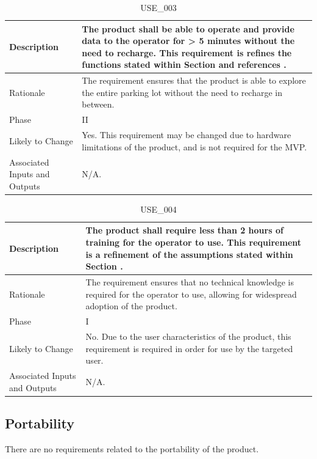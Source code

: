 \documentclass{article}
\begin{document}
\begin{table}[!h]
\begin{center}
\caption {USE\_003} 
\label{USE_003}
\begin{tabular}{ | m{3cm} | m{11cm} | }
\hline
Description & The product shall be able to operate and provide data to the operator for > 5 minutes without the need to recharge. This requirement is refines the functions stated within Section \nameref{subsec:ProdFunc} and references \nameref{MTNC_001}. \\
\hline
Rationale & The requirement ensures that the product is able to explore the entire parking lot without the need to recharge in between. \\
\hline
Phase & II \\
\hline
Likely to Change & Yes. This requirement may be changed due to hardware limitations of the product, and is not required for the MVP. \\
\hline
Associated Inputs and Outputs & N/A.  \\
\hline
\end{tabular}
\end{center}
\end{table}

\begin{table}[!h]
\begin{center}
\caption {USE\_004} 
\label{USE_004}
\begin{tabular}{ | m{3cm} | m{11cm} | }
\hline
Description & The product shall require less than 2 hours of training for the operator to use. This requirement is a refinement of the assumptions stated within Section \nameref{sec:Assumptions}. \\
\hline
Rationale & The requirement ensures that no technical knowledge is required for the operator to use, allowing for widespread adoption of the product. \\
\hline
Phase & I \\
\hline
Likely to Change & No. Due to the user characteristics of the product, this requirement is required in order for use by the targeted user. \\
\hline
Associated Inputs and Outputs & N/A.  \\
\hline
\end{tabular}
\end{center}
\end{table}

\clearpage
\newpage

\subsection{ Portability}
There are no requirements related to the portability of the product.
\end{document}
